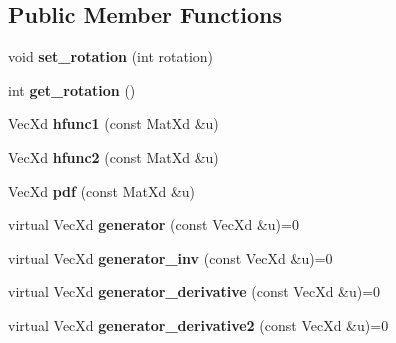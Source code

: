 \subsection*{Public Member Functions}
\begin{DoxyCompactItemize}
\item 
\hypertarget{class_archimedean_bicop_ad542153cb27d96e9fd85f2e2e93d9dfd}{void {\bfseries set\+\_\+rotation} (int rotation)}\label{class_archimedean_bicop_ad542153cb27d96e9fd85f2e2e93d9dfd}

\item 
\hypertarget{class_archimedean_bicop_a6bf27c4076d9853c999d7e6ce4e747d3}{int {\bfseries get\+\_\+rotation} ()}\label{class_archimedean_bicop_a6bf27c4076d9853c999d7e6ce4e747d3}

\item 
\hypertarget{class_archimedean_bicop_a397ef81d9ac5ebb6c4d47c520a98dbf7}{Vec\+Xd {\bfseries hfunc1} (const Mat\+Xd \&u)}\label{class_archimedean_bicop_a397ef81d9ac5ebb6c4d47c520a98dbf7}

\item 
\hypertarget{class_archimedean_bicop_ae8c0b538f9cb2547e64b76e285c63b4b}{Vec\+Xd {\bfseries hfunc2} (const Mat\+Xd \&u)}\label{class_archimedean_bicop_ae8c0b538f9cb2547e64b76e285c63b4b}

\item 
\hypertarget{class_archimedean_bicop_addeaac55646b169715db4d5673a7f464}{Vec\+Xd {\bfseries pdf} (const Mat\+Xd \&u)}\label{class_archimedean_bicop_addeaac55646b169715db4d5673a7f464}

\item 
\hypertarget{class_archimedean_bicop_a9b79997308dc154a23808b84a863c563}{virtual Vec\+Xd {\bfseries generator} (const Vec\+Xd \&u)=0}\label{class_archimedean_bicop_a9b79997308dc154a23808b84a863c563}

\item 
\hypertarget{class_archimedean_bicop_af12082f1046554e0121b2c7d93148f13}{virtual Vec\+Xd {\bfseries generator\+\_\+inv} (const Vec\+Xd \&u)=0}\label{class_archimedean_bicop_af12082f1046554e0121b2c7d93148f13}

\item 
\hypertarget{class_archimedean_bicop_a9a18bbc021eb033c5b7d992d6d572b9b}{virtual Vec\+Xd {\bfseries generator\+\_\+derivative} (const Vec\+Xd \&u)=0}\label{class_archimedean_bicop_a9a18bbc021eb033c5b7d992d6d572b9b}

\item 
\hypertarget{class_archimedean_bicop_a16d7c2474e7e9bd16fa60a02550762ed}{virtual Vec\+Xd {\bfseries generator\+\_\+derivative2} (const Vec\+Xd \&u)=0}\label{class_archimedean_bicop_a16d7c2474e7e9bd16fa60a02550762ed}


\end{DoxyCompactItemize}
